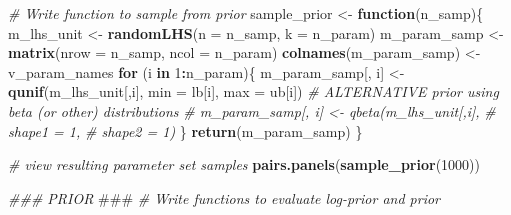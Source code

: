 \documentclass[
]{article}
\newenvironment{Shaded}{\begin{snugshade}}{\end{snugshade}}
\newcommand{\AlertTok}[1]{\textcolor[rgb]{0.94,0.16,0.16}{#1}}
\newcommand{\CommentTok}[1]{\textcolor[rgb]{0.56,0.35,0.01}{\textit{#1}}}
\newcommand{\ControlFlowTok}[1]{\textcolor[rgb]{0.13,0.29,0.53}{\textbf{#1}}}
\newcommand{\DataTypeTok}[1]{\textcolor[rgb]{0.13,0.29,0.53}{#1}}
\newcommand{\DecValTok}[1]{\textcolor[rgb]{0.00,0.00,0.81}{#1}}
\newcommand{\KeywordTok}[1]{\textcolor[rgb]{0.13,0.29,0.53}{\textbf{#1}}}
\newcommand{\NormalTok}[1]{#1}
\newcommand{\OperatorTok}[1]{\textcolor[rgb]{0.81,0.36,0.00}{\textbf{#1}}}
\newcommand{\StringTok}[1]{\textcolor[rgb]{0.31,0.60,0.02}{#1}}
\begin{document}
\begin{Shaded}
\begin{Highlighting}[]
\CommentTok{# Write function to sample from prior}
\NormalTok{sample_prior <-}\StringTok{ }\ControlFlowTok{function}\NormalTok{(n_samp)\{}
\NormalTok{  m_lhs_unit   <-}\StringTok{ }\KeywordTok{randomLHS}\NormalTok{(}\DataTypeTok{n =}\NormalTok{ n_samp, }\DataTypeTok{k =}\NormalTok{ n_param)}
\NormalTok{  m_param_samp <-}\StringTok{ }\KeywordTok{matrix}\NormalTok{(}\DataTypeTok{nrow =}\NormalTok{ n_samp, }\DataTypeTok{ncol =}\NormalTok{ n_param)}
  \KeywordTok{colnames}\NormalTok{(m_param_samp) <-}\StringTok{ }\NormalTok{v_param_names}
  \ControlFlowTok{for}\NormalTok{ (i }\ControlFlowTok{in} \DecValTok{1}\OperatorTok{:}\NormalTok{n_param)\{}
\NormalTok{    m_param_samp[, i] <-}\StringTok{ }\KeywordTok{qunif}\NormalTok{(m_lhs_unit[,i],}
                               \DataTypeTok{min =}\NormalTok{ lb[i],}
                               \DataTypeTok{max =}\NormalTok{ ub[i])}
    \CommentTok{# ALTERNATIVE prior using beta (or other) distributions}
    \CommentTok{# m_param_samp[, i] <- qbeta(m_lhs_unit[,i],}
    \CommentTok{#                            shape1 = 1,}
    \CommentTok{#                            shape2 = 1)}
\NormalTok{  \}}
  \KeywordTok{return}\NormalTok{(m_param_samp)}
\NormalTok{\}}

\CommentTok{# view resulting parameter set samples}
\KeywordTok{pairs.panels}\NormalTok{(}\KeywordTok{sample_prior}\NormalTok{(}\DecValTok{1000}\NormalTok{))}


\CommentTok{###  PRIOR  }\AlertTok{###}\CommentTok{ }
\CommentTok{# Write functions to evaluate log-prior and prior}


\end{Highlighting}
\end{Shaded}
\end{document}
